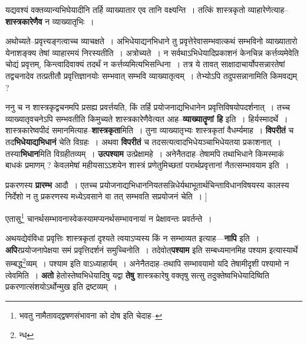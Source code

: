 \documentclass[article,12pt,a4paper]{memoir}
\begin{document}
	  \pstart यद्यवश्यं वक्तव्यान्यभिघेयादीनि तर्हि व्याख्यातार एव तानि वक्ष्यन्ति । तत्किं शास्त्रकृतो व्याहारेणेत्याह--\textbf{शास्त्रकारेणैव} न व्याख्यातृभिः ।
	\pend
      

	  \pstart अथोच्यते--प्रवृत्त्यङ्गत्वाच्च व्याचक्षते । अभिधेयाद्यनभिधाने तु प्रवृत्तेरेवासम्भवात्कथं सम्भविनो व्याख्यातारो येनाशङ्क्य तेषां व्याहारमयं निरस्यतीति । अत्रोच्यते । न सर्वथाऽभिधेयादिप्रकाशनं केनचिन्न कर्त्तव्यमेवेति चोद्यं प्रवृत्तम्, किन्त्वादिवाक्यं तदर्थं न कर्त्तव्यमित्यभिसन्धिना । तत्र ये तावत् साक्षादाचार्योपसन्नारतेषां तद्वचनादेव तत्प्रतीतौ प्रवृत्तिज्ञानयोः सम्भवात् सम्भवि व्याख्यातृत्वम् । तेभ्योऽपि तदुपसन्नानामिति किमवद्यम् ?
	\pend
      

	  \pstart ननु च न शास्त्रकृद्वचनमपि प्रसह्य प्रवर्त्तयति, किं तर्हि प्रयोजनाद्यभिधानेन प्रवृत्तिविषयोपदर्शनात् । तच्च व्याख्यातृवचनेऽपि सम्भवतीति किमुच्यते शास्त्रकारेणैवेत्यत आह--\textbf{व्याख्यातॄणां हि} इति । हिर्यस्मादर्थे । शास्त्रकारेष्वपीदं समानमित्याह--\textbf{शास्त्रकृता}मिति । तुना व्याख्यातृभ्यः शास्त्रकृतां वैधर्म्यमाह । \textbf{विपरीतं} च तद\textbf{भिधेयाद्यभिधानं} चेति विग्रहः । अथवा \textbf{विपरीतं} च तदसत्यत्वादभिधेयञ्चाभिधेयतया प्रकाशनात् । तस्या\textbf{भिधान}मिति विग्रहीतव्यम् । \textbf{उत्पश्याम} उत्प्रेक्षामहे । अनेनैतदाह--तेषामपि तथाभिधाने किमस्माकं बाधकं प्रमाणम् ? केवलमेषां महीयसाऽऽशयेन शास्त्रं प्रणेतुमिच्छतां परार्थप्रवृत्तानां नैतत्सम्भावयाम इति ।
	\pend
      

	  \pstart प्रकरणस्य \textbf{प्रारम्भ} आदौ । एतच्च प्रयोजनाद्यभिधाननियतसन्निधेर्यथाभूतार्थचिन्ताविधानविषयस्य कालस्य निर्देशो न तु प्रकरणस्य \leavevmode{} मध्येऽवसाने वा तत् सम्भवति सप्रयोजनं चेति ।
	\pend
      [[उपायोऽस्ति प्रयो० C]]\leavevmode{}
	  \bigskip
	  \begingroup
	

	  \pstart एतासु\footnote{भवतु नामैतावद्द्वषणसंभावना को दोष इति चेदाह--\cite{dp-msD-n}} चानर्थसम्भावनास्वेकस्यामप्यनर्थसम्भावनायां न प्रेक्षावन्तः प्रवर्तन्ते ।
	\pend
      
	  \endgroup
	

	  \pstart अथयद्येवंविधा प्रवृत्तिः शास्त्रकृतां दृश्यते त्वयाऽप्यस्य किं न सम्भाव्यत इत्याह—\textbf{नापि} इति । \textbf{अपि}रप्रयोजनापेक्षया समं प्रवृत्तिदर्शनं समुच्चिनोति । तदेवोत्\textbf{पश्याम} इति सम्बध्यमानमिह पश्याम इत्यास्यार्थे सम्बद्ध\footnote{न्ध}व्यम् । पश्याम इति वाऽध्याहार्यम् । अनेनैतदाह--तथापि सम्भावयामो यदि तेषामीदृशी पश्यामो न त्वेवमिति । \textbf{अतो} हेतोस्तेष्वभिधेयादिषु यद्वा \textbf{तेषु} शास्त्रकारेषु वक्तृषु सत्सु तदुक्तेष्वभिधेयादिष्विति प्रकरणात्संशयोऽर्थोन्मुख इति द्रष्टव्यम् ।
	\pend
      
\end{document}

